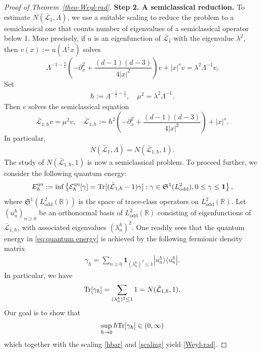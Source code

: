\documentclass[%
11pt,  reqno]{amsart}
\theoremstyle{remarkstyle}
\newcommand{\1}{\hspace{0.2mm}\text{I}\hspace{0.2mm}}
\newcommand{\R}{\mathbb{R}}
\renewcommand{\L}{\mathcal{L}}
\newcommand{\ld}{\lambda}
\newcommand{\ind}{\mathbf 1}
\DeclareMathOperator*{\qua}{qu}
\numberwithin{equation}{section}
\numberwithin{theorem}{section}
\begin{document}
\begin{proof}[Proof of Theorem~\ref{theo-Weyl-rad}]
		{\bf Step 2. A semiclassical reduction.} To estimate $N(\bar{\L}_1,\Lambda)$, we use a suitable scaling to reduce the problem to a semiclassical one that counts number of eigenvalues of a semiclassical operator below 1. More precisely, if $u$ is an eigenfunction of $\bar{\L}_1$ with the eigenvalue $\ld^2$, then $v(x):= u(\Lambda^{\frac{1}{s}} x)$ solves 
		$$
		\Lambda^{-1-\frac{2}{s}} \left(-\partial^2_x +\frac{(d-1)(d-3)}{4|x|^2}\right) v + |x|^s v = \lambda^2 \Lambda^{-1} v.
		$$
		Set 
		\begin{align} \label{hbar}
			\hbar := \Lambda^{-\frac{1}{2}-\frac{1}{s}}, \quad \mu^2 = \lambda^2 \Lambda^{-1}.
		\end{align} 
		Then $v$ solves the semiclassical equation
		$$
		\bar{\L}_{1,\hbar} v = \mu^2 v, \quad \bar{\L}_{1,\hbar} := \hbar^2 \left(-\partial^2_x +\frac{(d-1)(d-3)}{4|x|^2}\right) + |x|^s.
		$$
		In particular, 
		\begin{align} \label{scaling}
			N(\bar{\L}_1,\Lambda)= N(\bar{\L}_{1,\hbar},1).
		\end{align}
		The study of $N(\bar{\L}_{1,\hbar},1)$ is now a semiclassical problem. To proceed further, we consider the following quantum energy: 
		\begin{equation}\label{eq:quantum energy}
			E^{\qua}_{\hbar} := \inf \left\{\mathcal E^{\qua}_{\hbar}[\gamma] = {\rm Tr}[(\bar{\L}_{1,\hbar} -1)\gamma] : \gamma \in \mathfrak{S}^1(L^2_{\text{odd}}), 0 \leq \gamma \leq \ind\right\},
		\end{equation}
		where $\mathfrak{S}^1(L^2_{\text{odd}}(\R))$ is the space of trace-class operators on $L^2_{\text{odd}}(\R)$. Let $(u^{\hbar}_n)_{n\geq 0}$ be an orthonormal basis of $L^2_{\text{odd}}(\R)$ consisting of eigenfunctions of $\bar{\L}_{1,\hbar}$, with associated eigenvalues $(\lambda_n^\hbar)^2$. One readily sees that the quantum energy in \eqref{eq:quantum energy} is achieved by the following fermionic density matrix
		\begin{align} \label{gamma-h}
			\gamma_{\hbar} = \sum_{n\geq 0} \ind_{ (\lambda_n^\hbar)^2 \leq 1} |u^{\hbar}_n\rangle \langle u^{\hbar}_n|.
		\end{align} 
		In particular, we have
		\[
		{\rm Tr}[\gamma_{\hbar}] = \sum_{(\lambda_n^{\hbar})^2 \leq 1} 1 = N(\bar{\L}_{1,\hbar},1).
		\]
		Our goal is to show that
		\begin{align}\label{limi-trac-h}
			\sup_{\hbar \to 0} \hbar {\rm Tr}[\gamma_{\hbar}] \in (0,\infty)	
		\end{align}
		which together with the scaling \eqref{hbar} and \eqref{scaling} yield \eqref{Weyl-rad}.
		

\end{proof}
\end{document}
